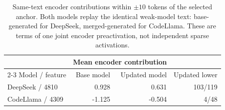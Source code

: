 \begin{table}[t]
\centering\small
\caption{Same-text encoder contributions within $\pm10$ tokens of the selected anchor. Both models replay the identical weak-model text: base-generated for DeepSeek, merged-generated for CodeLlama. These are terms of one joint encoder preactivation, not independent sparse activations.}
\label{tab:case-same-text}
\setlength{\tabcolsep}{4pt}
\begin{tabular}{@{}lrrr@{}}
\toprule
 & \multicolumn{2}{c}{Mean encoder contribution} & \\
\cmidrule(lr){2-3}
Model / feature & Base model & Updated model & Updated lower \\
\midrule
DeepSeek / 4810 & 0.928 & 0.631 & 103/119 \\
CodeLlama / 4309 & -1.125 & -0.504 & 4/48 \\
\bottomrule
\end{tabular}
\end{table}
